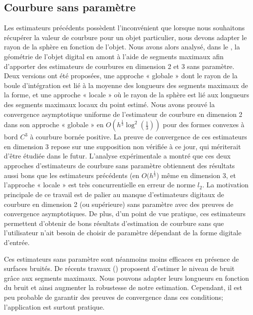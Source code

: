 \subsection*{Courbure sans paramètre}
%
Les estimateurs précédents possèdent l'inconvénient que lorsque nous souhaitons récupérer
la valeur de courbure pour un objet particulier, nous devons adapter le rayon de
la sphère en fonction de l'objet. Nous avons alors analysé, dans le
, la géométrie de l'objet digital en amont à
l'aide de segments maximaux afin d'apporter des estimateurs de courbures en
dimension 2 et 3 sans paramètre. Deux versions ont été proposées, une approche «
globale » dont le rayon de la boule d'intégration est lié à la moyenne des
longueurs des segments maximaux de la forme, et une approche « locale » où le
rayon de la sphère est lié aux longueurs des segments maximaux locaux du point
estimé.
%
Nous avons prouvé la convergence asymptotique uniforme de l'estimateur de
courbure en dimension 2 dans son approche « globale » en $O\left(h^\frac{1}{3} \log^2
\left(\frac{1}{3}\right)\right)$ pour des formes convexes à bord $C^3$ à courbure
bornée positive. La preuve de convergence de ces estimateurs en dimension 3
repose sur une supposition non vérifiée à ce jour, qui mériterait d'être étudiée
dans le futur.
%
L'analyse expérimentale a montré que ces deux approches d'estimateurs de
courbure sans paramètre obtiennent des résultats aussi bons que les estimateurs
précédents (en $O(h^\frac{1}{3}$) même en dimension 3, et l'approche « locale »
est très concurrentielle en erreur de norme $l_2$.
%
La motivation principale de ce travail est de palier au manque
d'estimateurs digitaux de courbure en dimension 2 (ou supérieure) sans paramètre
avec des preuves de convergence asymptotiques. De plus, d'un point de vue
pratique, ces estimateurs permettent d'obtenir de bons résultats d'estimation de
courbure sans que l'utilisateur n'ait besoin de choisir de paramètre dépendant de la
forme digitale d'entrée.

Ces estimateurs sans paramètre sont néanmoins moins efficaces en présence de surfaces
bruités. De récents travaux () proposent
d'estimer le niveau de bruit grâce aux segments maximaux. Nous pouvons
adapter leurs longueurs en fonction du bruit et ainsi augmenter la robustesse de
notre estimation. Cependant, il est peu probable de garantir des preuves de
convergence dans ces conditions; l'application est surtout pratique.
%
